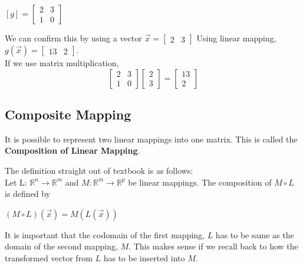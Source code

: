 \documentclass[12pt]{article}
\newcommand{\R}{\mathbb{R}}
\begin{document}
\begin{center}
$[g] = \begin{bmatrix}2 & 3\\1 & 0\end{bmatrix}$
\end{center}
We can confirm this by using a vector $\vec{x} = \begin{bmatrix}2 & 3\end{bmatrix} $
Using linear mapping, $g(\vec{x}) = \begin{bmatrix}13 & 2\end{bmatrix}$.\\
If we use matrix multiplication,
\begin{equation}
\begin{bmatrix}2 & 3\\1 & 0\end{bmatrix}\begin{bmatrix}2 \\ 3\end{bmatrix}=  \begin{bmatrix}13 \\ 2\end{bmatrix}
\end{equation}

\subsection{Composite Mapping}
It is possible to represent two linear mappings into one matrix. This is called the \textbf{Composition of Linear Mapping}.

The definition straight out of textbook is as follows:\\
Let L: $\R^n \rightarrow \R^m$ and $M: \R^m \rightarrow \R^p$ be linear mappings. The composition of $M \circ L$ is defined by \\
\begin{center}
$(M \circ L)(\vec{x}) = M(L(\vec{x}))$
\end{center} 
\cite{textbook}
It is important that the codomain of the first mapping, $L$ has to be same as the domain of the second mapping, $M$. This makes sense if we recall back to how the transformed vector from $L$ has to be inserted into $M$.
\end{document}

